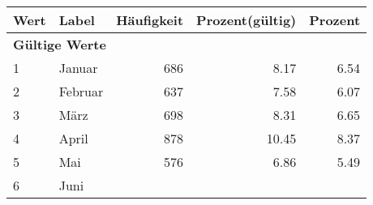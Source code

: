      \begin{longtable}{lXrrr}
     \toprule
     \textbf{Wert} & \textbf{Label} & \textbf{Häufigkeit} & \textbf{Prozent(gültig)} & \textbf{Prozent} \\
     \endhead
     \midrule
     \multicolumn{5}{l}{\textbf{Gültige Werte}}\\

     1 &
     \multicolumn{1}{X}{ Januar   } &


       \num{686} &
       \num[round-mode=places,round-precision=2]{8,17} &
         \num[round-mode=places,round-precision=2]{6,54} \\

     2 &
     \multicolumn{1}{X}{ Februar   } &


       \num{637} &
       \num[round-mode=places,round-precision=2]{7,58} &
         \num[round-mode=places,round-precision=2]{6,07} \\

     3 &
     \multicolumn{1}{X}{ März   } &


       \num{698} &
       \num[round-mode=places,round-precision=2]{8,31} &
         \num[round-mode=places,round-precision=2]{6,65} \\

     4 &
     \multicolumn{1}{X}{ April   } &


       \num{878} &
       \num[round-mode=places,round-precision=2]{10,45} &
         \num[round-mode=places,round-precision=2]{8,37} \\

     5 &
     \multicolumn{1}{X}{ Mai   } &


       \num{576} &
       \num[round-mode=places,round-precision=2]{6,86} &
         \num[round-mode=places,round-precision=2]{5,49} \\

     6 &
     \multicolumn{1}{X}{ Juni   } &



\end{longtable}
